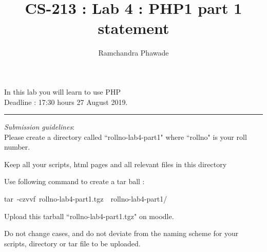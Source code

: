 \documentclass{article}
\title{CS-213 : Lab 4 : PHP1 part 1 statement}
\author{Ramchandra Phawade}
\begin{document}
\maketitle 

\noindent 
\begin{center} 
\noindent
In this lab you will learn to use PHP \\
\noindent
Deadline : 17:30 hours  27 August 2019.
\end{center} 

\hrule
\vspace*{0.5cm}
\noindent 
\emph{Submission guidelines}:\\
 
\noindent 
Please create a directory called ``rollno-lab4-part1" where ``rollno" is your
roll number.
 
\noindent 
Keep all your scripts, html pages and all relevant files in this directory 

\noindent 
Use following command to create a tar ball :
\begin{center}
    tar~-czvvf~rollno-lab4-part1.tgz~~rollno-lab4-part1/ 
\end{center}
 
\noindent 
Upload this tarball ``rollno-lab4-part1.tgz" on moodle. 
 
\noindent 
Do not change cases, and do not deviate from the  
naming scheme for your scripts, directory or tar file to be uploaded. 
 
\end{document}
